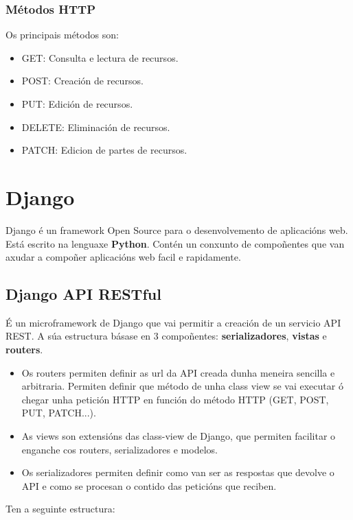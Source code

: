 \documentclass[11pt,twoside]{book}
\begin{document}
\subsubsection{Métodos HTTP}

Os principais métodos son:

\begin{itemize}
    \item GET: Consulta e lectura de recursos.
    \item POST: Creación de recursos.
    \item PUT: Edición de recursos.
    \item DELETE: Eliminación de recursos.
    \item PATCH: Edicion de partes de recursos.
\end{itemize}

\section{Django}

Django é un framework Open Source para o desenvolvemento de aplicacións web. Está escrito na lenguaxe \textbf{Python}. Contén un conxunto de compoñentes que van axudar a compoñer aplicacións web facil e rapidamente.

\subsection{Django API RESTful}

É un microframework de Django que vai permitir a creación de un servicio API REST. A súa estructura básase en 3 compoñentes: \textbf{serializadores}, \textbf{vistas} e \textbf{routers}.

\begin{itemize}
    \item Os routers permiten definir as url da API creada dunha meneira sencilla e arbitraria. Permiten definir que método de unha class view se vai executar ó chegar unha petición HTTP en función do método HTTP (GET, POST, PUT, PATCH...).
    \item As views son extensións das class-view de Django, que permiten facilitar o enganche cos routers, serializadores e modelos.
    \item Os serializadores permiten definir como van ser as respostas que devolve o API e como se procesan o contido das peticións que reciben.
\end{itemize}

Ten a seguinte estructura:
\end{document}
